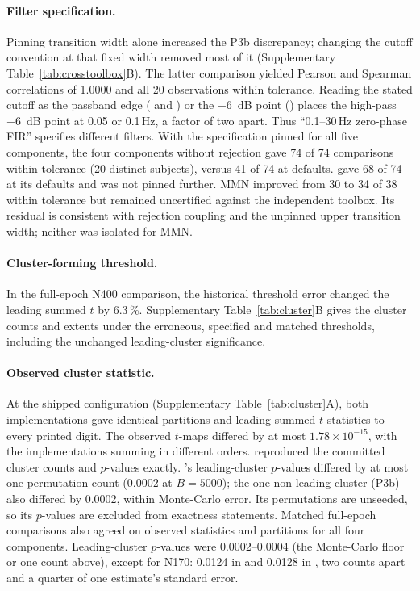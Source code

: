 \paragraph{Filter specification.} Pinning transition width alone increased the \fieldtrip{} P3b discrepancy; changing the cutoff convention at that fixed width removed most of it (Supplementary Table~\ref*{tab:crosstoolbox}B). The latter comparison yielded Pearson and Spearman correlations of 1.0000 and all 20 observations within tolerance. Reading the stated cutoff as the passband edge (\mne{} and \eeglab{}) or the \SI{-6}{dB} point (\fieldtrip{}) places the high-pass \SI{-6}{dB} point at 0.05 or 0.1\,Hz, a factor of two apart. Thus ``0.1--30\,Hz zero-phase FIR'' specifies different filters. With the specification pinned for all five components, the four components without rejection gave 74 of 74 comparisons within tolerance (20 distinct subjects), versus 41 of 74 at \fieldtrip{} defaults. \eeglab{} gave 68 of 74 at its defaults and was not pinned further. MMN improved from 30 to 34 of 38 within tolerance but remained uncertified against the independent toolbox. Its residual is consistent with rejection coupling and the unpinned \mne{} upper transition width; neither was isolated for MMN.

\paragraph{Cluster-forming threshold.} In the full-epoch N400 comparison, the historical threshold error changed the leading summed \(t\) by 6.3\,\%. Supplementary Table~\ref*{tab:cluster}B gives the cluster counts and extents under the erroneous, specified and matched thresholds, including the unchanged leading-cluster significance.

\paragraph{Observed cluster statistic.}

At the shipped configuration (Supplementary Table~\ref*{tab:cluster}A), both implementations gave identical partitions and leading summed \(t\) statistics to every printed digit. The observed \(t\)-maps differed by at most \(1.78\times10^{-15}\), with the implementations summing in different orders. \mne{} reproduced the committed cluster counts and \(p\)-values exactly. \fieldtrip{}'s leading-cluster \(p\)-values differed by at most one permutation count (0.0002 at \(B = 5000\)); the one non-leading cluster (P3b) also differed by 0.0002, within Monte-Carlo error. Its permutations are unseeded, so its \(p\)-values are excluded from exactness statements. Matched full-epoch comparisons also agreed on observed statistics and partitions for all four components. Leading-cluster \(p\)-values were 0.0002--0.0004 (the Monte-Carlo floor or one count above), except for N170: 0.0124 in \mne{} and 0.0128 in \fieldtrip{}, two counts apart and a quarter of one estimate's standard error.

